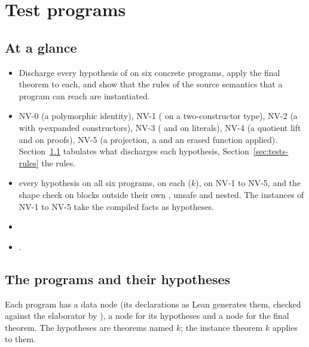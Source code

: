 \chapter{Test programs}\label{chap:tests}

\section*{At a glance}
\begin{itemize}
\item {} Discharge every hypothesis of  on six concrete programs, apply the final theorem to each, and show that the rules of the source semantics that a program can reach are instantiated.
\item {} NV-0 (a polymorphic identity), NV-1 ( on a two-constructor type), NV-2 (a  with $\eta$-expanded constructors), NV-3 ( and  on literals), NV-4 (a quotient lift and  on proofs), NV-5 (a projection, a  and an erased function applied). Section~\ref{sec:tests-table} tabulates what discharges each hypothesis, Section~\ref{sec:tests-rules} the rules.
\item {} \stProved{} every hypothesis on all six programs,  on each ($k$),  on NV-1 to NV-5, and the shape check  on blocks outside their own , unsafe and nested. The instances of NV-1 to NV-5 take the compiled facts as hypotheses.
\item {} 
\item {} .
\end{itemize}

\section{The programs and their hypotheses}\label{sec:tests-table}

Each program has a data node (its declarations as Lean generates them, checked against the elaborator by ), a node for its hypotheses and a node for the final theorem. The hypotheses are theorems named $k$; the instance theorem $k$ applies  to them.

